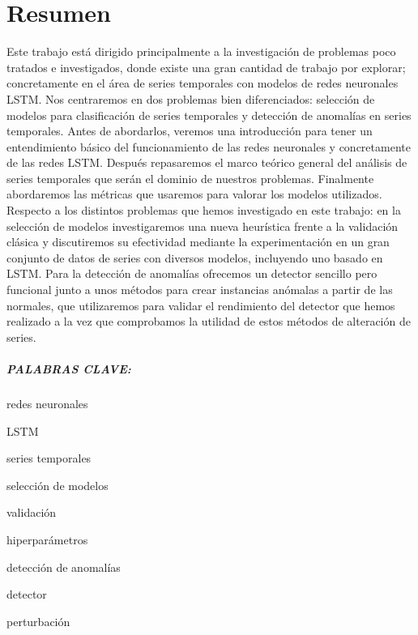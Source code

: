 %


\chapter*{Resumen}\label{ch:resumen}

Este trabajo está dirigido principalmente a la investigación de problemas poco tratados e investigados, donde existe una gran cantidad de trabajo por explorar; concretamente en el área de series temporales con modelos de redes neuronales LSTM. Nos centraremos en dos problemas bien diferenciados: selección de modelos para clasificación de series temporales y detección de anomalías en series temporales. Antes de abordarlos, veremos una introducción para tener un entendimiento básico del funcionamiento de las redes neuronales y concretamente de las redes LSTM. Después repasaremos el marco teórico general del análisis de series temporales que serán el dominio de nuestros problemas. Finalmente abordaremos las métricas que usaremos para valorar los modelos utilizados. Respecto a los distintos problemas que hemos investigado en este trabajo: en la selección de modelos investigaremos una nueva heurística frente a la validación clásica y discutiremos su efectividad mediante la experimentación en un gran conjunto de datos de series con diversos modelos, incluyendo uno basado en LSTM. Para la detección de anomalías ofrecemos un detector sencillo pero funcional junto a unos métodos para crear instancias anómalas a partir de las normales, que utilizaremos para validar el rendimiento del detector que hemos realizado a la vez que comprobamos la utilidad de estos métodos de alteración de series.

\paragraph{PALABRAS CLAVE:}
\begin{itemize*}[label=,itemsep=1em,itemjoin=\hspace{1em}]
  \item redes neuronales
  \item LSTM
  \item series temporales
  \item selección de modelos
  \item validación
  \item hiperparámetros
  \item detección de anomalías
  \item detector
  \item perturbación
\end{itemize*}

\endinput
